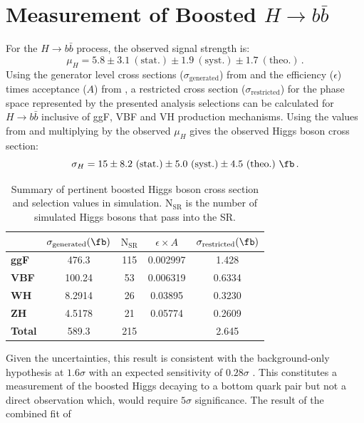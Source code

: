 \section{Measurement of Boosted $H \rightarrow b\bar{b}$} \label{sec:results:procedure}

For the $H \rightarrow b\bar{b}$ process, the observed signal strength is:
%
$$ \mu_{H} = 5.8 \pm 3.1~\mathrm{(stat.)} \pm 1.9~\mathrm{(syst.)} \pm
1.7~\mathrm{(theo.)}\,. $$
%
Using the generator level cross sections ($\sigma_\text{generated}$) from
 and the efficiency ($\epsilon$) times acceptance ($A$)
from , a restricted cross section
($\sigma_\text{restricted}$) for the phase space represented by the presented
analysis selections can be calculated for $H \rightarrow b\bar{b}$ inclusive of
ggF, VBF and VH production mechanisms.  Using the values from
 and multiplying by the observed $\mu_{H}$
gives the observed Higgs boson cross section:
%
$$ \sigma_{H} = 15 \pm 8.2 ~\mathrm{(stat.)} \pm 5.0 ~\mathrm{(syst.)} \pm
4.5 ~\mathrm{(theo.)} ~\fb \,. $$
%
\begin{table}[!t]
  \centering
  \begin{tabular}{l||c|c|c|c}
     & $ \sigma_\text{generated} (\fb)$ & $\mathrm{N}_\text{SR}$ & $\epsilon \times A$ & $\sigma_\text{restricted} (\fb)$ \\
    \hline
    \hline
    \textbf{ggF}   & 476.3  & 115 & 0.002997 & 1.428 \\
    \textbf{VBF}   & 100.24 & 53  & 0.006319 & 0.6334 \\
    \textbf{WH}    & 8.2914 & 26  & 0.03895  & 0.3230 \\
    \textbf{ZH}    & 4.5178 & 21  & 0.05774  & 0.2609 \\
    \hline
    \textbf{Total} & 589.3  & 215 &          & 2.645 \\
  \end{tabular} 
  \caption{Summary of pertinent boosted Higgs boson cross section and selection values in simulation. $\mathrm{N}_\text{SR}$ is the number of simulated Higgs bosons that pass into the SR.}
  \label{tab:results:signal_summary}
\end{table}
%
Given the uncertainties, this result is consistent with the background-only
hypothesis at $1.6\sigma$ with an expected sensitivity of $0.28\sigma$
\cite{Feickert:HiggsCouplings2018}.  This constitutes a measurement of the
boosted Higgs decaying to a bottom quark pair but not a direct observation
which, would require $5\sigma$ significance. The result of the combined fit of
